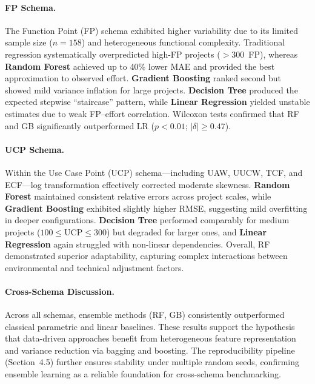 \documentclass{ieeeaccess}
\begin{document}
\paragraph{FP Schema.}
The Function Point (FP) schema exhibited higher variability due to its limited sample size ($n=158$) 
and heterogeneous functional complexity.  
Traditional regression systematically overpredicted high-FP projects ($>300$~FP), 
whereas \textbf{Random Forest} achieved up to 40\% lower MAE and provided 
the best approximation to observed effort.  
\textbf{Gradient Boosting} ranked second but showed mild variance inflation for large projects.  
\textbf{Decision Tree} produced the expected stepwise “staircase” pattern, 
while \textbf{Linear Regression} yielded unstable estimates due to weak FP–effort correlation.  
Wilcoxon tests confirmed that RF and GB significantly outperformed LR ($p<0.01$; $|\delta|\ge0.47$).

\paragraph{UCP Schema.}
Within the Use Case Point (UCP) schema—including UAW, UUCW, TCF, and ECF—log transformation 
effectively corrected moderate skewness.  
\textbf{Random Forest} maintained consistent relative errors across project scales, 
while \textbf{Gradient Boosting} exhibited slightly higher RMSE, 
suggesting mild overfitting in deeper configurations.  
\textbf{Decision Tree} performed comparably for medium projects ($100\!\le\!\mathrm{UCP}\!\le\!300$) 
but degraded for larger ones, and \textbf{Linear Regression} again struggled with non-linear dependencies.  
Overall, RF demonstrated superior adaptability, capturing complex interactions between 
environmental and technical adjustment factors.

\paragraph{Cross-Schema Discussion.}
Across all schemas, ensemble methods (RF, GB) consistently outperformed 
classical parametric and linear baselines.  
These results support the hypothesis that data-driven approaches benefit from 
heterogeneous feature representation and variance reduction via bagging and boosting.  
The reproducibility pipeline (Section~4.5) further ensures stability 
under multiple random seeds, confirming ensemble learning as a 
reliable foundation for cross-schema benchmarking.
\end{document}
